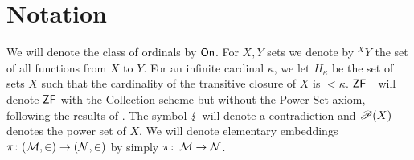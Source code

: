 \documentclass[../main]{subfiles}
\begin{document}
\chapter{Notation}
\thispagestyle{fancy}

\setlength{\parindent}{18pt}
\begin{onehalfspacing}

We will denote the class of ordinals by $\textsf{On}$. For $X,Y$ sets we denote by ${^X}Y$ the set of all functions from $X$ to $Y$. For an infinite cardinal $\kappa$, we let $H_\kappa$ be the set of sets $X$ such that the cardinality of the transitive closure of $X$ is ${<}\kappa$. $\textsf{ZF}^-$ will denote $\textsf{ZF}$ with the Collection scheme but without the Power Set axiom, following the results of \cite{ZFwithoutPowerSet}. The symbol $\operatorname{\lightning}$ will denote a contradiction and $\mathscr P(X)$ denotes the power set of $X$. We will denote elementary embeddings $\pi\colon(\operatorname{\mathcal M},\in)\to(\operatorname{\mathcal N},\in)$ by simply $\pi\colon\operatorname{\mathcal M}\to\operatorname{\mathcal N}$.


\end{onehalfspacing}
\setlength{\parindent}{0pt}
\end{document}
